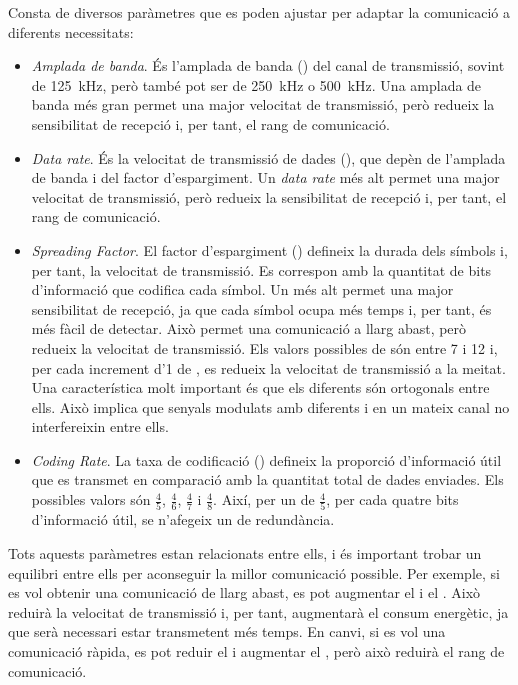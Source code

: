\documentclass{tfgitic}[2024/07/01]
\begin{document}
Consta de diversos paràmetres que es poden ajustar per adaptar la comunicació a diferents necessitats:
\begin{itemize}
    \item \emph{Amplada de banda}. És l'amplada de banda () del canal de transmissió, sovint de \SI{125}{\kHz}, però també pot ser de \SI{250}{\kHz} o \SI{500}{\kHz}. Una amplada de banda més gran permet una major velocitat de transmissió, però redueix la sensibilitat de recepció i, per tant, el rang de comunicació.
    \item \emph{Data rate}. És la velocitat de transmissió de dades (), que depèn de l'amplada de banda i del factor d'espargiment. Un  \emph{data rate} més alt permet una major velocitat de transmissió, però redueix la sensibilitat de recepció i, per tant, el rang de comunicació.
    \item \emph{Spreading Factor}. El factor d'espargiment () defineix la durada dels símbols i, per tant, la velocitat de transmissió. Es correspon amb la quantitat de bits d'informació que codifica cada símbol. Un  més alt permet una major sensibilitat de recepció, ja que cada símbol ocupa més temps i, per tant, és més fàcil de detectar. Això permet una comunicació a llarg abast, però redueix la velocitat de transmissió. Els valors possibles de  són entre 7 i 12 i, per cada increment d'1 de , es redueix la velocitat de transmissió a la meitat. Una característica molt important és que els diferents  són ortogonals entre ells. Això implica que senyals modulats amb diferents  i en un mateix canal no interfereixin entre ells. 
    \item \emph{Coding Rate}. La taxa de codificació () defineix la proporció d'informació útil que es transmet en comparació amb la quantitat total de dades enviades. Els possibles valors són $\frac{4}{5}$, $\frac{4}{6}$, $\frac{4}{7}$ i $\frac{4}{8}$. Així, per un  de $\frac{4}{5}$, per cada quatre bits d'informació útil, se n'afegeix un de redundància.
\end{itemize}

Tots aquests paràmetres estan relacionats entre ells, i és important trobar un equilibri entre ells per aconseguir la millor comunicació possible. Per exemple, si es vol obtenir una comunicació de llarg abast, es pot augmentar el  i el . Això reduirà la velocitat de transmissió i, per tant, augmentarà el consum energètic, ja que serà necessari estar transmetent més temps. En canvi, si es vol una comunicació ràpida, es pot reduir el  i augmentar el , però això reduirà el rang de comunicació.
\end{document}
